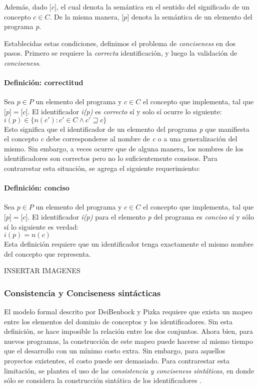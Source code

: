 Además, dado $\lbrack c \rbrack$, el cual denota la semántica en el sentido del significado de un concepto $c \in C$. De la misma manera, $\lbrack p \rbrack$ denota la semántica de un elemento del programa \textit{p}.

Establecidas estas condiciones, definimos el problema de \textit{conciseness} en dos pasos. Primero se requiere la \textit{correcta} identificación, y luego la validación de \textit{conciseness}.

\paragraph{Definición: correctitud}
Sea $p \in P$ un elemento del programa y $c \in C$ el concepto que implementa, tal que $\lbrack p \rbrack = \lbrack c \rbrack$. El identificador \textit{i(p)} es \textit{correcto} sí y solo sí ocurre lo siguiente:
\\$i(p) \in \lbrace n(c') : c' \in C \land c' \sqsupseteq c \rbrace$
\\Esto significa que el identificador de un elemento del programa \textit{p} que manifiesta el concepto \textit{c} debe corresponderse al nombre de \textit{c} o a una generalización del mismo. Sin embargo, a veces ocurre que de alguna manera, los nombres de los identificadores son correctos pero no lo suficientemente consisos. Para contrarestar esta situación, se agrega el siguiente requerimiento:

\paragraph{Definición: conciso}
Sea $p \in P$ un elemento del programa y $c \in C$ el concepto que implementa, tal que $\lbrack p \rbrack = \lbrack c \rbrack$. El identificador \textit{i(p)} para el elemento \textit{p} del programa es \textit{conciso} sí y sólo sí lo siguiente es verdad:
\\$i(p) = n(c)$
\\Esta definición requiere que un identificador tenga exactamente el mismo nombre del concepto que representa.

INSERTAR IMAGENES

\subsubsection{Consistencia y Conciseness sintácticas}
El modelo formal descrito por DeiBenbock y Pizka requiere que exista un mapeo entre los elementos del dominio de conceptos y los identificadores. Sin esta definición, se hace imposible la relación entre los dos conjuntos. Ahora bien, para nuevos programas, la construcción de este mapeo puede hacerse al mismo tiempo que el desarrollo con un mínimo costo extra. Sin embargo, para aquellos proyectos existentes, el costo puede ser demasiado. Para contrarestar esta limitación, se plantea el uso de las \textit{consistencia y conciseness sintáticas}, en donde sólo se considera la construcción sintática de los identificadores \cite{LawrieFeildBinkley06}.

